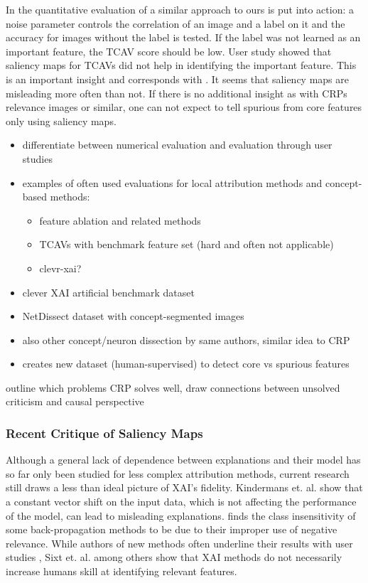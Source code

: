 In the quantitative evaluation of \cite{Kim2018} a similar approach to ours is put into action:
a noise parameter controls the correlation of an image and a label on it and the accuracy for images without the label is tested. If the label was not learned as an important feature, the TCAV score should be low. User study showed that saliency maps for TCAVs did not help in identifying the important feature. This is an important insight and corresponds with \cite{Sixt2022a}. It seems that saliency maps are misleading more often than not. If there is no additional insight as with CRPs relevance images or similar, one can not expect to tell spurious from core features only using saliency maps.

\begin{itemize}
      \item differentiate between numerical evaluation and evaluation through user studies
      \item examples of often used evaluations for local attribution methods and concept-based methods:
            \begin{itemize}
                  \item feature ablation and related methods
                  \item TCAVs \cite{Kim2018} with benchmark feature set (hard and often not applicable)
                  \item clevr-xai? \cite{Arras2022}
            \end{itemize}
      \item clever XAI artificial benchmark dataset \cite{Arras2022}
      \item NetDissect dataset with concept-segmented images \cite{Bau2017}
      \item also other concept/neuron dissection by same authors, similar idea to CRP \cite{Bau2020}
      \item creates new dataset (human-supervised) to detect core vs spurious features \cite{Singla2022}
\end{itemize}
{\color{red} outline which problems CRP solves well, draw connections between unsolved criticism and causal perspective}

\subsubsection{Recent Critique of Saliency Maps}

Although a general lack of dependence between explanations and their model \cite{Adebayo2018,Karimi2023} has so far only been studied for less complex attribution methods, current research still draws a less than ideal picture of XAI's fidelity.
Kindermans et. al. \cite{Kindermans2019} show that a constant vector shift on the input data, which is not affecting the performance of the model, can lead to misleading explanations. \cite{Sixt2020} finds the class insensitivity of some back-propagation methods to be due to their improper use of negative relevance.
While authors of new methods often underline their results with user studies , Sixt et. al. \cite{Sixt2022a} among others  show that XAI methods do not necessarily increase humans skill at identifying relevant features.

